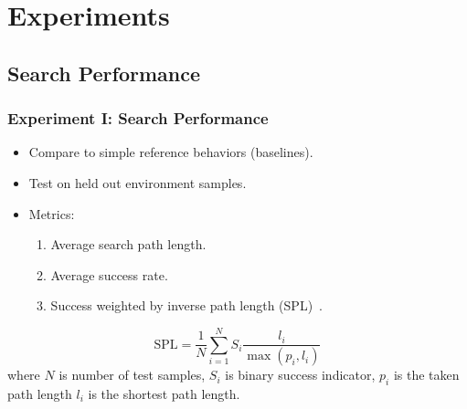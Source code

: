 \section{Experiments}

\subsection{Search Performance}

\begin{frame}
    \frametitle{Experiment I: Search Performance}

    \begin{itemize}
        \item Compare to simple reference behaviors (baselines).
        \item Test on held out environment samples.
        \item Metrics:
        \begin{enumerate}
            \item Average search path length.
            \item Average success rate.
            \item Success weighted by inverse path length (SPL)~\cite{anderson_evaluation_2018}.
        \end{enumerate}
    \end{itemize}

    \begin{definition}
        \begin{equation*}
            \text{SPL} = \frac{1}{N} \sum_{i=1}^N S_i \frac{l_i}{\max(p_i,l_i)}
        \end{equation*}
        where \(N\) is number of test samples, \(S_i\) is binary success indicator, \(p_i\) is the taken path length \(l_i\) is the shortest path length.
    \end{definition}

\end{frame}

